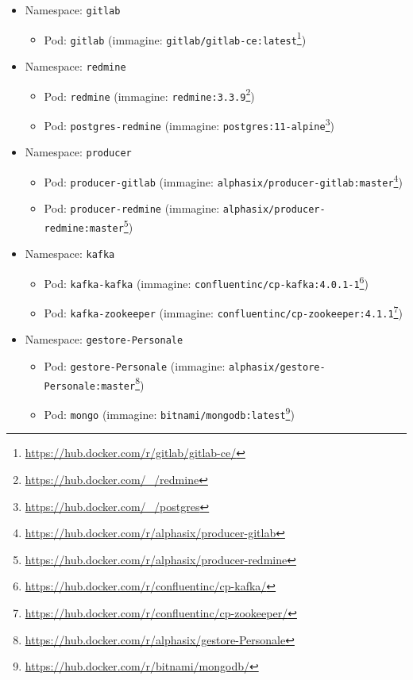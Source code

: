 \begin{itemize}
	\item Namespace: \texttt{gitlab}
	\begin{itemize}
		\item Pod: \texttt{gitlab} (immagine: \texttt{gitlab/gitlab-ce:latest}\footnote{\url{https://hub.docker.com/r/gitlab/gitlab-ce/}})%
	\end{itemize}

	\item Namespace: \texttt{redmine}
	\begin{itemize}
		\item Pod: \texttt{redmine} (immagine: \texttt{redmine:3.3.9}\footnote{\url{https://hub.docker.com/_/redmine}})
		\item Pod: \texttt{postgres-redmine} (immagine: \texttt{postgres:11-alpine}\footnote{\url{https://hub.docker.com/_/postgres}})
	\end{itemize}

	\item Namespace: \texttt{producer}
	\begin{itemize}
		\item Pod: \texttt{producer-gitlab} (immagine: \texttt{alphasix/producer-gitlab:master}\footnote{\url{https://hub.docker.com/r/alphasix/producer-gitlab}})
		\item Pod: \texttt{producer-redmine} (immagine: \texttt{alphasix/producer-redmine:master}\footnote{\url{https://hub.docker.com/r/alphasix/producer-redmine}})
	\end{itemize}

	\item Namespace: \texttt{kafka}
	\begin{itemize}
		\item Pod: \texttt{kafka-kafka} (immagine: \texttt{confluentinc/cp-kafka:4.0.1-1}\footnote{\url{https://hub.docker.com/r/confluentinc/cp-kafka/}})
		\item Pod: \texttt{kafka-zookeeper} (immagine: \texttt{confluentinc/cp-zookeeper:4.1.1}\footnote{\url{https://hub.docker.com/r/confluentinc/cp-zookeeper/}})
	\end{itemize}

	\item Namespace: \texttt{gestore-Personale}
	\begin{itemize}
		\item Pod: \texttt{gestore-Personale} (immagine: \texttt{alphasix/gestore-Personale:master}\footnote{\url{https://hub.docker.com/r/alphasix/gestore-Personale}})
		\item Pod: \texttt{mongo} (immagine: \texttt{bitnami/mongodb:latest}\footnote{\url{https://hub.docker.com/r/bitnami/mongodb/}})
	\end{itemize}


\end{itemize}
